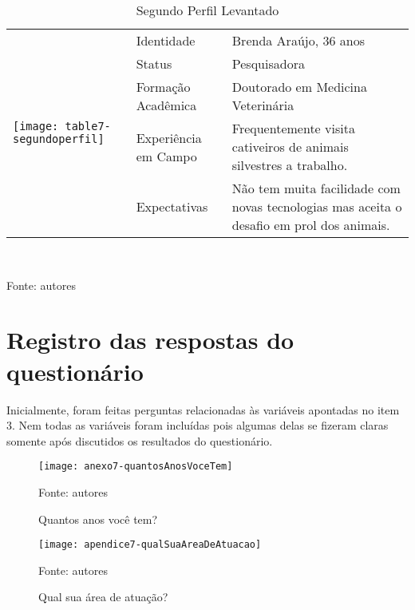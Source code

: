\begin{table}[ht]
\centering
\caption{Segundo Perfil Levantado}
\vspace{0.5cm}
\begin{tabular}{| l | l | m{8cm} |}
\hline
\multirow{5}{*}{\texttt{[image: table7-segundoperfil]}} & Identidade & Brenda Araújo, 36 anos\\ \cline{2-3}
& Status & Pesquisadora\\%
& Formação Acadêmica & Doutorado em Medicina Veterinária\\ %
& Experiência em Campo & Frequentemente visita cativeiros de animais silvestres a trabalho.\\ %
& Expectativas & Não tem muita facilidade com novas tecnologias mas aceita o desafio em prol dos animais.\\ %
\hline
\end{tabular}
\vspace{0.4cm}\\
\centerline{\small{Fonte: autores}}
\end{table}

\FloatBarrier

\section{Registro das respostas do questionário}

Inicialmente, foram feitas perguntas relacionadas às variáveis apontadas no item 3. Nem todas as variáveis foram incluídas pois algumas delas se fizeram claras somente após discutidos os resultados do questionário.

\begin{figure}[ht]
  \centering
    \caption{Quantos anos você tem?}
    \texttt{[image: anexo7-quantosAnosVoceTem]}
	\centerline{\small{Fonte: autores}}
\end{figure}
\FloatBarrier

\begin{figure}[ht]
  \centering
    \caption{Qual sua área de atuação?}
    \texttt{[image: apendice7-qualSuaAreaDeAtuacao]}
	\centerline{\small{Fonte: autores}}
\end{figure}
\FloatBarrier

